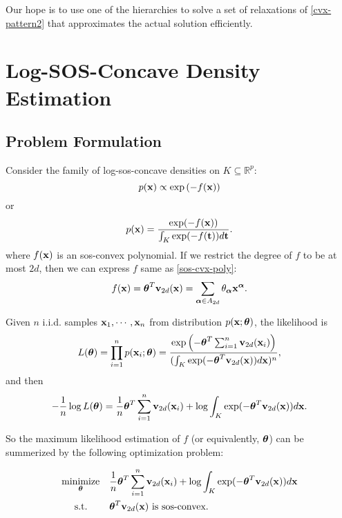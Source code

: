 \documentclass[11pt]{article}
\newcommand{\optprob}[5]
{
	\begin{equation}\label{#5}
	\begin{aligned}
	& \underset{#2}{\text{#1}}
	& & #3 \\
	& \text{\quad\ s.t.}
	& & #4
	\end{aligned}
	\end{equation}
}
\begin{document}
Our hope is to use one of the hierarchies to solve a set of relaxations of \eqref{cvx-pattern2} that approximates the actual solution efficiently.

\clearpage
\section{Log-SOS-Concave Density Estimation}

\subsection{Problem Formulation}
Consider the family of log-sos-concave densities on $K \subseteq \mathbb R^p$:
\begin{equation} \notag
p({\bf x}) \propto \exp \left(-f({\bf x})\right)
\end{equation}
or
\begin{equation} \notag
p({\bf x}) = \frac{\exp (-f({\bf x}))}{\int_K \exp (-f({\bf t})) d{\bf t}}.
\end{equation}
where $f({\bf x})$ is an sos-convex polynomial. If we restrict the degree of $f$ to be at most $2d$, then we can express $f$ same as \eqref{sos-cvx-poly}:
\[
f({\bf x}) = {\boldsymbol\theta}^T{\bf v}_{2d}({\bf x}) = \sum_{{\boldsymbol\alpha} \in A_{2d}} \theta_{\boldsymbol\alpha} {\bf x}^{\boldsymbol\alpha}.
\]

Given $n$ i.i.d. samples ${\bf x}_1, \cdots, {\bf x}_n$ from distribution $p({\bf x}; {\boldsymbol\theta})$, the likelihood is
\begin{equation} \notag
L({\boldsymbol\theta}) = \prod_{i = 1} ^n p({\bf x}_i; {\boldsymbol\theta}) = \frac{\exp \left( -{\boldsymbol\theta}^T \sum_{i = 1}^n {\bf v}_{2d}({\bf x}_i)   \right)}{(\int_K \exp (-{\boldsymbol\theta}^T{\bf v}_{2d}({\bf x})) d{\bf x})^n},
\end{equation}
and then
$$- \frac{1}{n} \log L({\boldsymbol\theta}) = \frac{1}{n} {\boldsymbol\theta}^T \sum_{i = 1}^n {\bf v}_{2d}({\bf x}_i) + \log \int_K \exp (-{\boldsymbol\theta}^T{\bf v}_{2d}({\bf x})) d{\bf x}.$$

So the maximum likelihood estimation of $f$ (or equivalently, ${\boldsymbol\theta}$) can be summerized by the following optimization problem:
\optprob{minimize}{\bftheta}{\frac{1}{n} \bftheta^T \sum_{i = 1}^n \bfv_{2d}(\bfx_i) + \log \int_K \exp (-\bftheta^T\bfv_{2d}(\bfx)) d{\bf x} }
{\text{$\bftheta^T \bfv_{2d}(\bfx)$ is sos-convex.}}{maxlike-reg}

\end{document}
